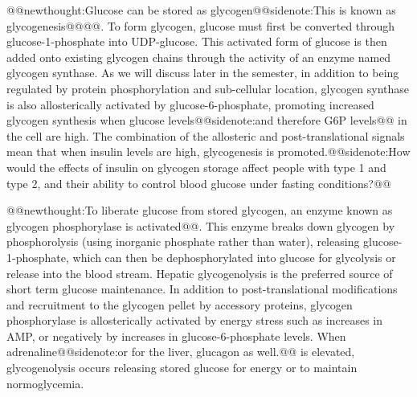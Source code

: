 \documentclass{tufte-handout}
\makeatletter
\def\newthought#1{@@newthought:#1@@}
\def\sidenote#1{@@sidenote:#1@@}
\makeatother
\begin{document}
\newthought{Glucose can be stored as glycogen\sidenote{This is known as glycogenesis}}.  To form glycogen, glucose must first be converted through glucose-1-phosphate into UDP-glucose.  This activated form of glucose is then added onto existing glycogen chains through the activity of an enzyme named glycogen synthase.  As we will discuss later in the semester, in addition to being regulated by protein phosphorylation and sub-cellular location, glycogen synthase is also allosterically activated by glucose-6-phosphate, promoting increased glycogen synthesis when glucose levels\sidenote{and therefore G6P levels} in the cell are high.  The combination of the allosteric and post-translational signals mean that when insulin levels are high, glycogenesis is promoted.\sidenote{How would the effects of insulin on glycogen storage affect people with type 1 and type 2, and their ability to control blood glucose under fasting conditions?}

\newthought{To liberate glucose from stored glycogen, an enzyme known as glycogen phosphorylase\index{Enzymes!Glycogen Phosphorylase} is activated}.  This enzyme breaks down glycogen by phosphorolysis (using inorganic phosphate rather than water), releasing glucose-1-phosphate, which can then be dephosphorylated into glucose for glycolysis or release into the blood stream.  Hepatic glycogenolysis is the preferred source of short term glucose maintenance.  In addition to post-translational modifications and recruitment to the glycogen pellet by accessory proteins, glycogen phosphorylase is allosterically activated by energy stress such as increases in AMP, or negatively by increases in glucose-6-phosphate levels.  When adrenaline\sidenote{or for the liver, glucagon as well.} is elevated, glycogenolysis occurs releasing stored glucose for energy or to maintain normoglycemia.
\end{document}
